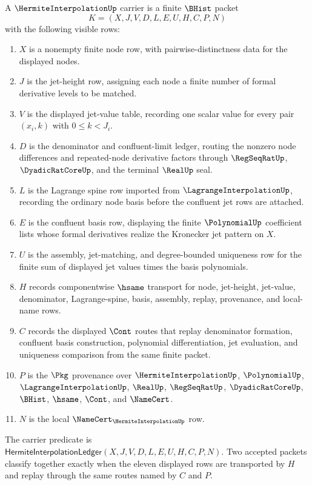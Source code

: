 \begin{definition}
\label{def:hermite-interpolation-carrier}
A $\HermiteInterpolationUp$ carrier is a finite $\BHist$ packet
$$
K=(X,J,V,D,L,E,U,H,C,P,N)
$$
with the following visible rows:
\begin{enumerate}
\item $X$ is a nonempty finite node row, with pairwise-distinctness data for the displayed nodes.
\item $J$ is the jet-height row, assigning each node a finite number of formal derivative levels to be matched.
\item $V$ is the displayed jet-value table, recording one scalar value for every pair $(x_i,k)$ with $0\leq k<J_i$.
\item $D$ is the denominator and confluent-limit ledger, routing the nonzero node differences and repeated-node derivative factors through $\RegSeqRatUp$, $\DyadicRatCoreUp$, and the terminal $\RealUp$ seal.
\item $L$ is the Lagrange spine row imported from $\LagrangeInterpolationUp$, recording the ordinary node basis before the confluent jet rows are attached.
\item $E$ is the confluent basis row, displaying the finite $\PolynomialUp$ coefficient lists whose formal derivatives realize the Kronecker jet pattern on $X$.
\item $U$ is the assembly, jet-matching, and degree-bounded uniqueness row for the finite sum of displayed jet values times the basis polynomials.
\item $H$ records componentwise $\hsame$ transport for node, jet-height, jet-value, denominator, Lagrange-spine, basis, assembly, replay, provenance, and local-name rows.
\item $C$ records the displayed $\Cont$ routes that replay denominator formation, confluent basis construction, polynomial differentiation, jet evaluation, and uniqueness comparison from the same finite packet.
\item $P$ is the $\Pkg$ provenance over $\HermiteInterpolationUp$, $\PolynomialUp$, $\LagrangeInterpolationUp$, $\RealUp$, $\RegSeqRatUp$, $\DyadicRatCoreUp$, $\BHist$, $\hsame$, $\Cont$, and $\NameCert$.
\item $N$ is the local $\NameCert_{\HermiteInterpolationUp}$ row.
\end{enumerate}
The carrier predicate is
$\mathsf{HermiteInterpolationLedger}(X,J,V,D,L,E,U,H,C,P,N)$. Two accepted packets classify together exactly when the eleven displayed rows are transported by $H$ and replay through the same routes named by $C$ and $P$.
\end{definition}

